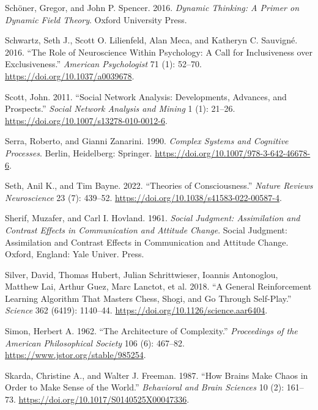 \documentclass[
  a4paper,
  DIV=11,
  numbers=noendperiod,
  oneside]{scrreprt}
\newlength{\cslhangindent}
\newenvironment{CSLReferences}[2] %
 {\begin{list}{}{%
  \setlength{\itemindent}{0pt}
  \setlength{\leftmargin}{0pt}
  \setlength{\parsep}{0pt}
  \ifodd #1
   \setlength{\leftmargin}{\cslhangindent}
   \setlength{\itemindent}{-1\cslhangindent}
  \fi
  \setlength{\itemsep}{#2\baselineskip}}}
 {\end{list}}
\begin{document}
\begin{CSLReferences}{1}{0}
Schöner, Gregor, and John P. Spencer. 2016. \emph{Dynamic Thinking: {A}
Primer on Dynamic Field Theory}. {Oxford University Press}.

Schwartz, Seth J., Scott O. Lilienfeld, Alan Meca, and Katheryn C.
Sauvigné. 2016. {``The Role of Neuroscience Within Psychology: A Call
for Inclusiveness over Exclusiveness.''} \emph{American Psychologist} 71
(1): 52--70. \url{https://doi.org/10.1037/a0039678}.

Scott, John. 2011. {``Social Network Analysis: Developments, Advances,
and Prospects.''} \emph{Social Network Analysis and Mining} 1 (1):
21--26. \url{https://doi.org/10.1007/s13278-010-0012-6}.

Serra, Roberto, and Gianni Zanarini. 1990. \emph{Complex {Systems} and
{Cognitive Processes}}. {Berlin, Heidelberg}: {Springer}.
\url{https://doi.org/10.1007/978-3-642-46678-6}.

Seth, Anil K., and Tim Bayne. 2022. {``Theories of Consciousness.''}
\emph{Nature Reviews Neuroscience} 23 (7): 439--52.
\url{https://doi.org/10.1038/s41583-022-00587-4}.

Sherif, Muzafer, and Carl I. Hovland. 1961. \emph{Social Judgment:
{Assimilation} and Contrast Effects in Communication and Attitude
Change}. Social Judgment: {Assimilation} and Contrast Effects in
Communication and Attitude Change. {Oxford, England}: {Yale Univer.
Press}.

Silver, David, Thomas Hubert, Julian Schrittwieser, Ioannis Antonoglou,
Matthew Lai, Arthur Guez, Marc Lanctot, et al. 2018. {``A General
Reinforcement Learning Algorithm That Masters Chess, Shogi, and {Go}
Through Self-Play.''} \emph{Science} 362 (6419): 1140--44.
\url{https://doi.org/10.1126/science.aar6404}.

Simon, Herbert A. 1962. {``The Architecture of Complexity.''}
\emph{Proceedings of the American Philosophical Society} 106 (6):
467--82. \url{https://www.jstor.org/stable/985254}.

Skarda, Christine A., and Walter J. Freeman. 1987. {``How Brains Make
Chaos in Order to Make Sense of the World.''} \emph{Behavioral and Brain
Sciences} 10 (2): 161--73.
\url{https://doi.org/10.1017/S0140525X00047336}.


\end{CSLReferences}
\end{document}
